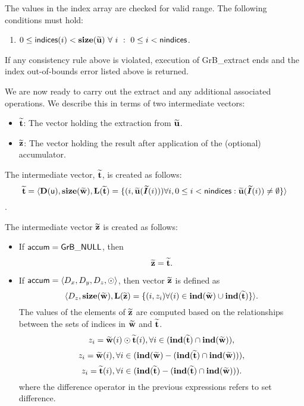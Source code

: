 The values in the index array are checked for valid range.  The following
conditions must hold:
\begin{enumerate}
	\item $0 \leq {\sf indices}(i) < \bold{size}({\bf \widetilde{u}})
    ~ \forall ~ i ~ : ~ 0 \leq i < {\sf nindices}$.
\end{enumerate}
If any consistency rule above is violated, execution of {\sf GrB\_extract} ends and 
the index out-of-bounds error listed above is returned.

We are now ready to carry out the extract and any additional 
associated operations.  We describe this in terms of two intermediate vectors:
\begin{itemize}
	\item ${\bf \widetilde{t}}$: The vector holding the extraction from
    ${\bf \widetilde{u}}$.
	\item ${\bf \widetilde{z}}$: The vector holding the result after 
    application of the (optional) accumulator.
\end{itemize}

The intermediate vector, ${\bf \widetilde{t}}$, is created as follows:
\[ {\bf \widetilde{t}} = \langle
\bold{D}({\sf u}), \bold{size}({\bf \widetilde{w}}),
\bold{L}({\bf \widetilde{t}}) =
\{(i,{\bf \widetilde{u}}(\bm{\widetilde{I}}(i))) \forall i, 0 \leq i < {\sf nindices} : 
{\bf \widetilde{u}}(\bm{\widetilde{I}}(i)) \neq \emptyset \} \rangle \]
.

The intermediate vector ${\bf \widetilde{z}}$ is created as follows:
\begin{itemize}
    \item If ${\sf accum} = {\sf GrB\_NULL}$, then \[ {\bf \widetilde{z}} = {\bf \widetilde{t}}.\]

    \item If ${\sf accum} = \langle D_x, D_y, D_z, \odot \rangle$, then vector ${\bf \widetilde{z}}$ is defined as 
        \[ \langle D_z, \bold{size}({\bf \widetilde{w}}), \bold{L}({\bf \widetilde{z}})
		= \{(i,z_{i})  \forall (i) \in \bold{ind}({\bf \widetilde{w}}) \cup 
        \bold{ind}({\bf \widetilde{t}}) \} \rangle.\]
    The values of the elements of ${\bf \widetilde{z}}$ are computed based on the relationships between the sets of indices in ${\bf \widetilde{w}}$ and ${\bf \widetilde{t}}$.
\[
z_{i} = {\bf \widetilde{w}}(i) \odot {\bf \widetilde{t}}(i), \forall i \in  (\bold{ind}({\bf \widetilde{t}}) \cap \bold{ind}({\bf \widetilde{w}})),
\]
\[
z_{i} = {\bf \widetilde{w}}(i), \forall  i \in  (\bold{ind}({\bf \widetilde{w}}) - (\bold{ind}({\bf \widetilde{t}}) \cap \bold{ind}({\bf \widetilde{w}}))),
\]
\[
z_{i} = {\bf \widetilde{t}}(i), \forall  i \in  (\bold{ind}({\bf \widetilde{t}}) - (\bold{ind}({\bf \widetilde{t}}) \cap \bold{ind}({\bf \widetilde{w}}))).
\]
where the difference operator in the previous expressions refers to set difference.
\end{itemize}

